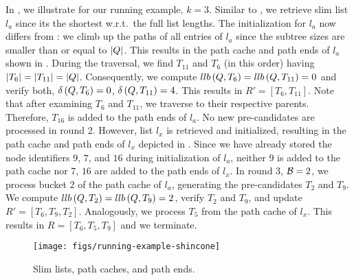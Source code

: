 \begin{example}

In , we illustrate \shincone{} for our running example, $k = 3$. Similar to \cone{}, we retrieve slim list $l_a$ since its the shortest w.r.t.\ the full list lengths. The initialization for $l_a$ now differs from \cone{}: we climb up the paths of all entries of $l_a$ since the subtree sizes are smaller than or equal to $\left| Q \right|$.
%
This results in the path cache and path ends of $l_a$ shown in . During the traversal, we find $T_{11}$ and $T_6$ (in this order) having $\left| T_6 \right| = \left| T_{11} \right| = \left| Q \right|$.
%
Consequently, we compute $llb \left( Q, T_6 \right) = llb \left( Q, T_{11} \right) = 0$ and verify both, $\delta \left( Q, T_6 \right) = 0$, $\delta \left( Q, T_{11} \right) = 4$. This results in $R' = \left[ T_6, T_{11} \right]$.
%
Note that after examining $T_6$ and $T_{11}$, we traverse to their respective parents. Therefore, $T_{16}$ is added to the path ends of $l_a$. No new pre-candidates are processed in round 2. However, list $l_x$ is retrieved and initialized, resulting in the path cache and path ends of $l_x$ depicted in .
%
Since we have already stored the node identifiers $9$, $7$, and $16$ during initialization of $l_a$, neither $9$ is added to the path cache nor $7$, $16$ are added to the path ends of $l_x$. In round 3, $\mathcal{B} = 2$, we process bucket $2$ of the path cache of $l_a$, generating the pre-candidates $T_2$ and $T_9$.
%
We compute $llb \left( Q, T_2 \right) = llb \left( Q, T_9 \right) = 2$, verify $T_2$ and $T_9$, and update $R' = \left[ T_6, T_9, T_2 \right]$. Analogously, we process $T_5$ from the path cache of $l_x$. This results in $R = \left[ T_6, T_5, T_9 \right]$ and we terminate.

\begin{figure}[ht!]
  \centering
  \texttt{[image: figs/running-example-shincone]}
  \caption{Slim lists, path caches, and path ends.}
  \label{fig:running-example-shincone}
\end{figure}

\end{example}
